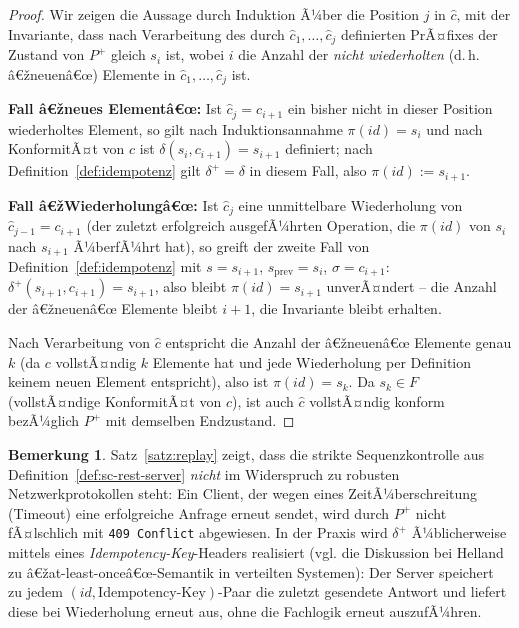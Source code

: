 ﻿\documentclass[a4paper,12pt]{article}
\theoremstyle{definition}
\newtheorem{bemerkung}{Bemerkung}
\begin{document}
\begin{proof}
	Wir zeigen die Aussage durch Induktion Ã¼ber die Position $j$ in $\hat c$, mit der
	Invariante, dass nach Verarbeitung des durch $\hat c_1,\ldots,\hat c_j$ definierten
	PrÃ¤fixes der Zustand von $P^{+}$ gleich $s_i$ ist, wobei $i$ die Anzahl der
	\emph{nicht wiederholten} (d.\,h. â€žneuenâ€œ) Elemente in $\hat c_1,\ldots,\hat c_j$ ist.

	\textbf{Fall â€žneues Elementâ€œ:} Ist $\hat c_j = c_{i+1}$ ein bisher nicht in dieser
	Position wiederholtes Element, so gilt nach Induktionsannahme
	$\pi(id)=s_i$ und nach KonformitÃ¤t von $c$ ist $\delta(s_i,c_{i+1})=s_{i+1}$
	definiert; nach Definition~\ref{def:idempotenz} gilt $\delta^{+}=\delta$ in diesem
	Fall, also $\pi(id):=s_{i+1}$.

	\textbf{Fall â€žWiederholungâ€œ:} Ist $\hat c_j$ eine unmittelbare Wiederholung von
	$\hat c_{j-1}=c_{i+1}$ (der zuletzt erfolgreich ausgefÃ¼hrten Operation, die
	$\pi(id)$ von $s_i$ nach $s_{i+1}$ Ã¼berfÃ¼hrt hat), so greift der zweite Fall von
	Definition~\ref{def:idempotenz} mit $s=s_{i+1}$, $s_{\mathrm{prev}}=s_i$,
	$\sigma=c_{i+1}$: $\delta^{+}(s_{i+1},c_{i+1})=s_{i+1}$, also bleibt
	$\pi(id)=s_{i+1}$ unverÃ¤ndert -- die Anzahl der â€žneuenâ€œ Elemente bleibt $i+1$, die
	Invariante bleibt erhalten.

	Nach Verarbeitung von $\hat c$ entspricht die Anzahl der â€žneuenâ€œ Elemente genau $k$
	(da $c$ vollstÃ¤ndig $k$ Elemente hat und jede Wiederholung per Definition keinem
	neuen Element entspricht), also ist $\pi(id)=s_k$. Da $s_k\in F$ (vollstÃ¤ndige
	KonformitÃ¤t von $c$), ist auch $\hat c$ vollstÃ¤ndig konform bezÃ¼glich $P^{+}$ mit
	demselben Endzustand. \qedhere
\end{proof}

\begin{bemerkung}
	Satz~\ref{satz:replay} zeigt, dass die strikte Sequenzkontrolle aus
	Definition~\ref{def:sc-rest-server} \emph{nicht} im Widerspruch zu robusten
	Netzwerkprotokollen steht: Ein Client, der wegen eines ZeitÃ¼berschreitung (Timeout)
	eine erfolgreiche Anfrage erneut sendet, wird durch $P^{+}$ nicht fÃ¤lschlich mit
	\texttt{409 Conflict} abgewiesen. In der Praxis wird $\delta^{+}$ Ã¼blicherweise mittels
	eines \emph{Idempotency-Key}-Headers realisiert (vgl. die Diskussion bei
	Helland~\cite{helland2007} zu â€žat-least-onceâ€œ-Semantik in verteilten Systemen): Der
	Server speichert zu jedem $(id, \text{Idempotency-Key})$-Paar die zuletzt gesendete
	Antwort und liefert diese bei Wiederholung erneut aus, ohne die Fachlogik erneut
	auszufÃ¼hren.
\end{bemerkung}
\end{document}
